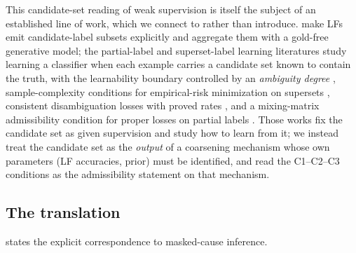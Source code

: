 This candidate-set reading of weak supervision is itself the subject
of an established line of work, which we connect to rather than
introduce. \citet{yu2022nplm} make LFs emit candidate-label subsets
explicitly and aggregate them with a gold-free generative model; the
partial-label and superset-label learning literatures study learning
a classifier when each example carries a candidate set known to
contain the truth, with the learnability boundary controlled by an
\emph{ambiguity degree} \citep{cour2011partial}, sample-complexity
conditions for empirical-risk minimization on supersets
\citep{liu2014superset}, consistent disambiguation losses with proved
rates \citep{cabannes2020infimum}, and a mixing-matrix admissibility
condition for proper losses on partial labels
\citep{cidsueiro2012proper}. Those works fix the candidate set as
given supervision and study how to learn from it; we instead treat the
candidate set as the \emph{output} of a coarsening mechanism whose
own parameters (LF accuracies, prior) must be identified, and read
the C1--C2--C3 conditions as the admissibility statement on that
mechanism.

\subsection{The translation}

 states the explicit correspondence to
masked-cause inference.

